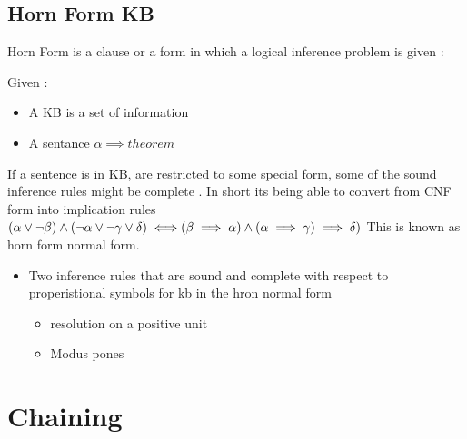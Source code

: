 \documentclass{article}
\theoremstyle{mytheoremstyle}
\theoremstyle{mytheoremstyle}
\theoremstyle{myproblemstyle}
\begin{document}
\subsection{Horn Form KB}
Horn Form is a clause or a form in which a logical inference problem is given :

Given : \\
\begin{itemize}
    \item A KB is a set of information
    \item A sentance $\alpha \implies theorem $
\end{itemize}

If a sentence is in KB, are restricted to some special form, some of the sound inference rules might be complete . In short its being able to convert from CNF form into implication rules
\\
\begin{math}
    (\alpha \lor \neg \beta) \land (\neg \alpha \lor \neg \gamma \lor \delta ) \\
    \iff \\
    (\beta \implies \alpha ) \land (\alpha \implies \gamma) \implies \delta)
\end{math}
This is known as horn form normal form.

\begin{itemize}
    \item Two inference rules that are sound and complete with respect to properistional symbols for kb in the hron normal form
        \begin{itemize}
            \item resolution on a positive unit
            \item Modus pones
        \end{itemize}
\end{itemize}



\section{Chaining}
\end{document}
